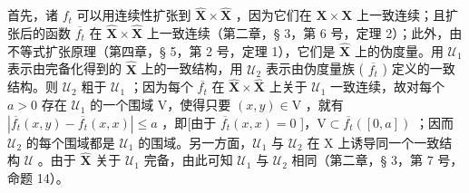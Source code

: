 首先，诸 \(f_{t}\) 可以用连续性扩张到 \(\hat{\mathbf{X}}\times\hat{\mathbf{X}}\) ，因为它们在 \(\mathbf{X}\times\mathbf{X}\) 上一致连续；且扩张后的函数 \(\overline{f_{t}}\) 在 \(\hat{\mathbf{X}}\times\hat{\mathbf{X}}\) 上一致连续（第二章，§ 3，第 6 号，定理 2）；此外，由不等式扩张原理（第四章，§ 5，第 2 号，定理 1），它们是 \(\hat{\mathbf{X}}\) 上的伪度量。用 \(\mathcal{U}_{1}\) 表示由完备化得到的 \(\hat{\mathbf{X}}\) 上的一致结构，用 \(\mathcal{U}_{2}\) 表示由伪度量族 ( \(\overline{f_{t}}\) ) 定义的一致结构。则 \(\mathcal{U}_{2}\) 粗于 \(\mathcal{U}_{1}\) ；因为每个 \(\overline{f_{t}}\) 在 \(\hat{\mathbf{X}}\times\hat{\mathbf{X}}\) 上关于 \(\mathcal{U}_{1}\) 一致连续，故对每个 \(a>0\) 存在 \(\mathcal{U}_{1}\) 的一个围域 V，使得只要 \((x,y)\in\mathrm{V}\) ，就有 \(|\overline{f_{t}}(x,y)-\overline{f_{t}}(x,x)|\leqslant a\) ，即{[}由于 \(\overline{f_{t}}(x,x)=0\) {]}，\(\mathrm{V}\subset\overline{f_{t}}([0,a])\) ；因而 \(\mathcal{U}_{2}\) 的每个围域都是 \(\mathcal{U}_{1}\) 的围域。另一方面，\(\mathcal{U}_{1}\) 与 \(\mathcal{U}_{2}\) 在 X 上诱导同一个一致结构 \(\mathcal{U}\) 。由于 \(\hat{\mathbf{X}}\) 关于 \(\mathcal{U}_{1}\) 完备，由此可知 \(\mathcal{U}_{1}\) 与 \(\mathcal{U}_{2}\) 相同（第二章，§ 3，第 7 号，命题 14）。

